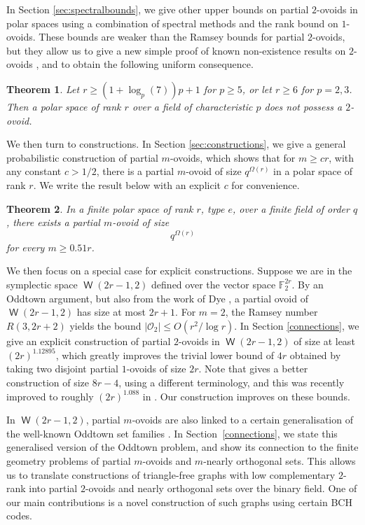 \documentclass[a4paper,11pt]{amsproc}
\theoremstyle{plain}
\newtheorem{Theorem} {Theorem} [section]
\theoremstyle{definition}
\newcommand{\<}{\langle}
\renewcommand{\>}{\rangle} %
\DeclareMathOperator\w{\mathsf{W}}
\begin{document}
In Section \ref{sec:spectralbounds}, we give other upper bounds on partial $2$-ovoids in polar spaces using a combination of spectral methods and the rank bound on $1$-ovoids. 
These bounds are weaker than the Ramsey bounds for partial $2$-ovoids, but they allow us to give a new simple proof of known non-existence results on $2$-ovoids \cite{BKLP2007}, and to obtain the following uniform consequence.

\begin{Theorem}\label{partial2ovoids_nonex}
Let $r \geq (1+\log_p(7))p+1$ for $p\geq 5$, or let $r\geq 6$ for $p=2,3$. 
Then a polar space of rank $r$ over a field of characteristic $p$ does not possess a $2$-ovoid.
\end{Theorem}

We then turn to constructions. 
In Section \ref{sec:constructions}, we give a general probabilistic construction of partial $m$-ovoids, which shows that for $m \geq cr$, with any constant $c > 1/2$, there is a partial $m$-ovoid of size $q^{\Omega(r)}$ in a polar space of rank $r$.
We write the result below with an explicit $c$ for convenience. 

\begin{Theorem} \label{probconstruction}
In a finite polar space of rank $r$, type $e$, over a finite field of order $q$, there exists a partial $m$-ovoid of size 
\[
q^{\Omega(r)}
\]
for every $m \geq 0.51r$.
\end{Theorem}

We then focus on a special case for explicit constructions.
Suppose we are in the symplectic space $\w(2r - 1, 2)$ defined over the vector space $\mathbb{F}_2^{2r}$. By an Oddtown argument, but also from the work of Dye \cite{Dye1992}, a partial ovoid of $\w(2r - 1, 2)$ has size at most $2r+1$.
For $m = 2$, the Ramsey number $R(3, 2r+2)$ yields the bound
$|\mathcal{O}_2| \le O(r^2/\log r)$. 
In Section \ref{connections}, 
we give an explicit construction of partial $2$-ovoids in $\w(2r - 1, 2)$ of size at least $(2r)^{1.12895}$, which greatly improves the trivial lower bound of $4r$ obtained by taking two disjoint partial $1$-ovoids of size $2r$. 
Note that \cite{Codenotti200} gives a better construction of size $8r - 4$, using a different terminology, and this was recently improved to roughly $(2r)^{1.088}$ in \cite{Golovnev2022}. 
Our construction improves on these bounds.

In $\w(2r - 1, 2)$, partial $m$-ovoids are also linked to a certain generalisation of the well-known Oddtown set families \cite{Berlekamp}. 
In Section~\ref{connections}, we state this generalised version of the Oddtown problem, and show its connection to the finite geometry problems of partial $m$-ovoids and $m$-nearly orthogonal sets. 
This allows us to translate constructions of triangle-free graphs with low complementary $2$-rank into partial $2$-ovoids and nearly orthogonal sets over the binary field.
One of our main contributions is a novel construction of such graphs using certain BCH codes.
\end{document}
